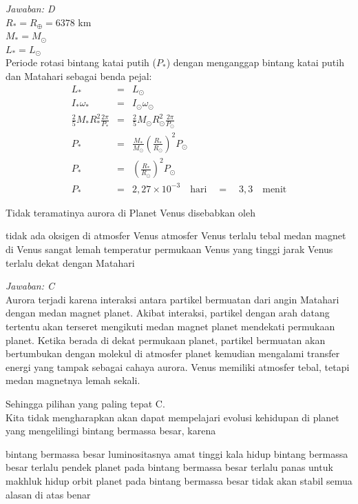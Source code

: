 \documentclass[11pt,fleqn]{exam}
\begin{document}
\begin{questions}
\textit{Jawaban: D} \\
$R_*=R_{\oplus}=6378$ km\\
$M_*=M_{\odot}$\\
$L_*=L_{\odot}$\\
Periode rotasi bintang katai putih ($P_*$) dengan menganggap bintang katai putih dan Matahari sebagai benda pejal:
\begin{eqnarray*}
L_*&=&L_{\odot}\\
I_*\omega_* &=& I_{\odot}\omega_{\odot}\\
\frac{2}{5}M_*R_*^2 \frac{2\pi}{P_*}&=&\frac{2}{5}M_{\odot}R_{\odot}^2\frac{2\pi}{P_{\odot}}\\
P_*&=& \frac{M_*}{M_{\odot}}\left(\frac{R_*}{R_{\odot}}\right)^2P_{\odot}\\
P_*&=&\left(\frac{R_*}{R_{\odot}}\right)^2P_{\odot}\\
P_*&=& 2,27\times 10^{-3}\quad \text{hari}\quad=\quad3,3 \quad \text{menit}
\end{eqnarray*}

\vspace{0.3cm}
\question Tidak teramatinya aurora di Planet Venus disebabkan oleh
\begin{choices}
\choice tidak ada oksigen di atmosfer Venus
\choice atmosfer Venus terlalu tebal
\choice medan magnet di Venus sangat lemah
\choice temperatur permukaan Venus yang tinggi
\choice jarak Venus terlalu dekat dengan Matahari
\end{choices}

\textit{Jawaban: C} \\
Aurora terjadi karena interaksi antara partikel bermuatan dari angin Matahari dengan medan magnet planet. Akibat interaksi, partikel dengan arah datang tertentu akan terseret mengikuti medan magnet planet mendekati permukaan planet. Ketika berada di dekat permukaan planet, partikel bermuatan akan bertumbukan dengan molekul di atmosfer planet kemudian mengalami transfer energi yang tampak sebagai cahaya aurora. Venus memiliki atmosfer tebal, tetapi medan magnetnya lemah sekali.

Sehingga pilihan yang paling tepat C.\\


\vspace{0.3cm}
\question Kita tidak mengharapkan akan dapat mempelajari evolusi kehidupan di planet yang mengelilingi bintang bermassa besar, karena
\begin{choices}
\choice bintang bermassa besar luminositasnya amat tinggi
\choice kala hidup bintang bermassa besar terlalu pendek
\choice planet pada bintang bermassa besar terlalu panas untuk makhluk hidup
\choice orbit planet pada bintang bermassa besar tidak akan stabil
\choice semua alasan di atas benar
\end{choices}


\end{questions}
\end{document}
